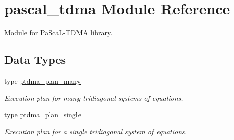 \hypertarget{namespacepascal__tdma}{}\section{pascal\+\_\+tdma Module Reference}
\label{namespacepascal__tdma}


Module for Pa\+Sca\+L-\/\+T\+D\+MA library.  


\subsection*{Data Types}
\begin{DoxyCompactItemize}
\item 
type \hyperlink{structpascal__tdma_1_1ptdma__plan__many}{ptdma\+\_\+plan\+\_\+many}
\begin{DoxyCompactList}\small\item\em Execution plan for many tridiagonal systems of equations. \end{DoxyCompactList}\item 
type \hyperlink{structpascal__tdma_1_1ptdma__plan__single}{ptdma\+\_\+plan\+\_\+single}
\begin{DoxyCompactList}\small\item\em Execution plan for a single tridiagonal system of equations. \end{DoxyCompactList}\end{DoxyCompactItemize}
